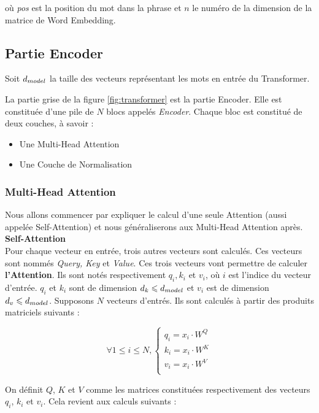 où \textit{pos} est la position du mot dans la phrase et $n$ le numéro de la dimension de la matrice de Word Embedding.

\subsection{Partie Encoder}

Soit $d_{model}$ la taille des vecteurs représentant les mots en entrée du Transformer.

La partie grise de la figure \ref{fig:transformer} est la partie Encoder. Elle est constituée d'une pile de $N$ blocs appelés \textit{Encoder}.
Chaque bloc est constitué de deux couches, à savoir :
\begin{itemize}
\item Une Multi-Head Attention
\item Une Couche de Normalisation
\end{itemize}


\subsubsection{Multi-Head Attention}

Nous allons commencer par expliquer le calcul d'une seule Attention (aussi appelée Self-Attention) et nous généraliserons aux Multi-Head Attention après. \\

\textbf{Self-Attention} \\

Pour chaque vecteur en entrée, trois autres vecteurs sont calculés. Ces vecteurs sont nommés \textit{Query, Key} et \textit{Value}.
Ces trois vecteurs vont permettre de calculer \textbf{l'Attention}.
Ils sont notés respectivement $q_i, k_i$ et $v_i$, où $i$ est l'indice du vecteur d'entrée. $q_i$ et $k_i$ sont de dimension
$d_k \leqslant d_{model}$ et $v_i$ est de dimension $d_v \leqslant d_{model}$.
Supposons $N$ vecteurs d'entrés. Ils sont calculés à partir des produits matriciels suivants :

\[ \forall 1 \leq i \leq N,
  \begin{cases}
  q_i = x_i \cdot W^Q \\
  k_i = x_i \cdot W^K \\
  v_i = x_i \cdot W^V \\
  \end{cases}  \]

On définit $Q$, $K$ et $V$ comme les matrices constituées respectivement des vecteurs $q_i$, $k_i$ et $v_i$.
Cela revient aux calculs suivants :


